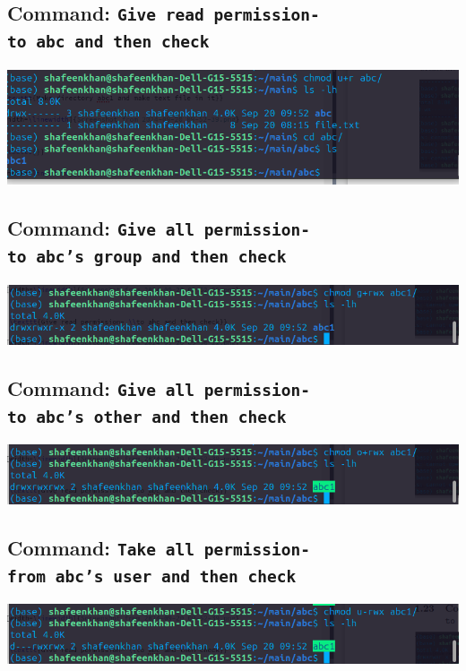 \documentclass[a4paper,12pt]{article}
\begin{document}
\subsection{Command: \texttt{Give read permission- \\to abc and then check}}
\begin{center}
    \includegraphics[width=\linewidth]{Screenshot from 2024-09-20 09-56-22.png}
\end{center}

\subsection{Command: \texttt{Give all permission- \\to abc's group and then check}}
\begin{center}
    \includegraphics[width=\linewidth]{Screenshot from 2024-09-20 09-59-23.png}
\end{center}

\subsection{Command: \texttt{Give all permission- \\to abc's other and then check}}
\begin{center}
    \includegraphics[width=\linewidth]{Screenshot from 2024-09-20 10-00-11.png}
\end{center}

\subsection{Command: \texttt{Take all permission- \\from abc's user and then check}}
\begin{center}
    \includegraphics[width=\linewidth]{Screenshot from 2024-09-20 10-01-19.png}
\end{center}
\end{document}

